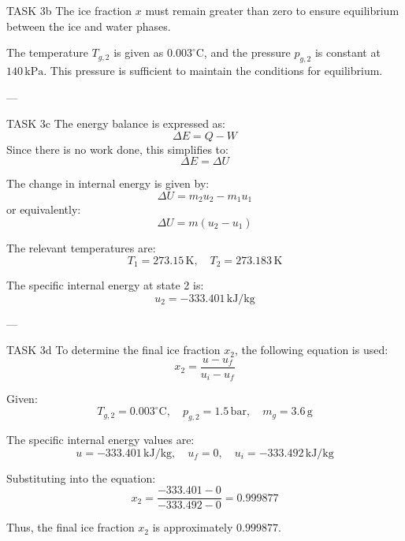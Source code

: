 TASK 3b  
The ice fraction \( x \) must remain greater than zero to ensure equilibrium between the ice and water phases.  

The temperature \( T_{g,2} \) is given as \( 0.003^\circ\text{C} \), and the pressure \( p_{g,2} \) is constant at \( 140 \, \text{kPa} \). This pressure is sufficient to maintain the conditions for equilibrium.  

---

TASK 3c  
The energy balance is expressed as:  
\[
\Delta E = Q - W
\]  
Since there is no work done, this simplifies to:  
\[
\Delta E = \Delta U
\]  

The change in internal energy is given by:  
\[
\Delta U = m_2 u_2 - m_1 u_1
\]  
or equivalently:  
\[
\Delta U = m (u_2 - u_1)
\]  

The relevant temperatures are:  
\[
T_1 = 273.15 \, \text{K}, \quad T_2 = 273.183 \, \text{K}
\]  

The specific internal energy at state 2 is:  
\[
u_2 = -333.401 \, \text{kJ/kg}
\]  

---

TASK 3d  
To determine the final ice fraction \( x_2 \), the following equation is used:  
\[
x_2 = \frac{u - u_f}{u_i - u_f}
\]  

Given:  
\[
T_{g,2} = 0.003^\circ\text{C}, \quad p_{g,2} = 1.5 \, \text{bar}, \quad m_g = 3.6 \, \text{g}
\]  

The specific internal energy values are:  
\[
u = -333.401 \, \text{kJ/kg}, \quad u_f = 0, \quad u_i = -333.492 \, \text{kJ/kg}
\]  

Substituting into the equation:  
\[
x_2 = \frac{-333.401 - 0}{-333.492 - 0} = 0.999877
\]  

Thus, the final ice fraction \( x_2 \) is approximately \( 0.999877 \).